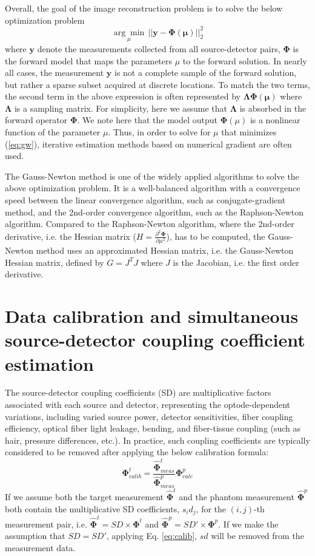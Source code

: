 \documentclass[12pt]{book}               %
\begin{document}
Overall, the goal of the image reconstruction problem is to solve the below optimization problem
\begin{equation}\label{eq:gw}
\underset{\mu}{\arg\min} \, || \mathbf{y-\Phi(\mu)} ||^2_2
\end{equation}
where $\mathbf y$ denote the measurements collected from all source-detector pairs, $\mathbf\Phi$ is the forward model that maps the parameters $\mu$ to the forward solution. In nearly all cases, the measurement $\mathbf y$ is not a complete sample of the forward solution, but rather a sparse subset acquired at discrete locations. To match the two terms, the second term in the above expression is often represented by $\mathbf{\Lambda\Phi(\mu)}$ where $\mathbf\Lambda$ is a sampling matrix. For simplicity, here we assume that $\mathbf\Lambda$ is absorbed in the forward operator $\mathbf\Phi$. We note here that the model output $\mathbf\Phi(\mu)$ is a nonlinear function of the parameter $\mu$. Thus, in order to solve for $\mu$ that minimizes (\ref{eq:gw}), iterative estimation methods based on numerical gradient are often used.

The Gauss-Newton method is one of the widely applied algorithms to solve the above optimization problem. It is a well-balanced algorithm with a convergence speed between the linear convergence algorithm, such as conjugate-gradient method, and the 2nd-order convergence algorithm, such as the Raphson-Newton algorithm. Compared to the Raphson-Newton algorithm, where the 2nd-order derivative, i.e. the Hessian matrix ($H=\frac{\partial^2 \mathbf\Phi}{\partial\mu^2}$), has to be computed, the Gauss-Newton method uses an approximated Hessian matrix, i.e. the Gauss-Newton Hessian matrix, defined by $G=J^TJ$ where $J$ is the Jacobian, i.e. the first order derivative.


\section{Data calibration and simultaneous source-detector coupling coefficient estimation}
The source-detector coupling coefficients (SD) are multiplicative factors associated with each source and detector, representing the optode-dependent variations, including varied source power, detector sensitivities, fiber coupling efficiency, optical fiber light leakage, bending, and fiber-tissue coupling (such as hair, pressure differences, etc.). In practice, such coupling coefficients are typically considered to be removed after applying the below calibration formula:
\begin{equation}\label{eq:calib}
\mathbf{\Phi}^{t}_{calib}=\frac{\hat{\mathbf{\Phi}}^{t}_{meas}}{\hat{\mathbf{\Phi}}^{p}_{meas}}\mathbf{\Phi}_{calc}^{p}
\end{equation}
If we assume both the target measurement $\hat{\mathbf{\Phi}}^{t}$ and the phantom measurement $\hat{\mathbf{\Phi}}^{p}$ both contain the multiplicative SD coefficients, $s_id_j$, for the $(i,j)$-th measurement pair, i.e. $\hat{\mathbf{\Phi}}^{t}=SD\times\mathbf{\Phi}^{t}$ and $\hat{\mathbf{\Phi}}^{p}=SD'\times\mathbf{\Phi}^{p}$. If we make the assumption that $SD=SD'$, applying Eq. \ref{eq:calib}, $sd$ will be removed from the measurement data.
\end{document}
